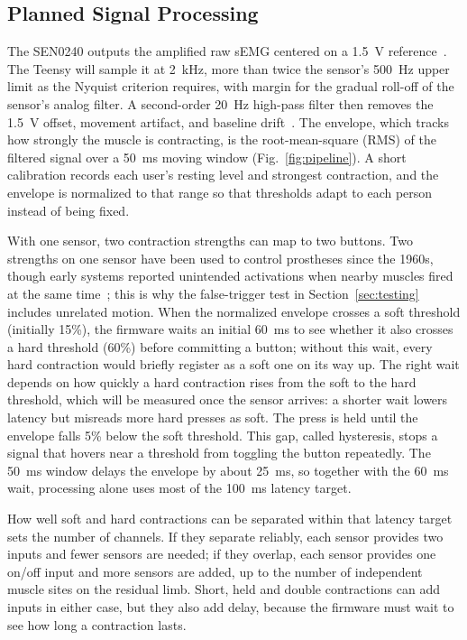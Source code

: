 \documentclass[conference]{IEEEtran}
\begin{document}
\subsection{Planned Signal Processing}
\label{sec:dsp}

The SEN0240 outputs the amplified raw sEMG centered on a 1.5~V reference~\cite{sen0240}. The Teensy will sample it at 2~kHz, more than twice the sensor's 500~Hz upper limit as the Nyquist criterion requires, with margin for the gradual roll-off of the sensor's analog filter. A second-order 20~Hz high-pass filter then removes the 1.5~V offset, movement artifact, and baseline drift~\cite{deluca}. The envelope, which tracks how strongly the muscle is contracting, is the root-mean-square (RMS) of the filtered signal over a 50~ms moving window (Fig.~\ref{fig:pipeline}). A short calibration records each user's resting level and strongest contraction, and the envelope is normalized to that range so that thresholds adapt to each person instead of being fixed.

With one sensor, two contraction strengths can map to two buttons. Two strengths on one sensor have been used to control prostheses since the 1960s, though early systems reported unintended activations when nearby muscles fired at the same time~\cite{dorcas}; this is why the false-trigger test in Section~\ref{sec:testing} includes unrelated motion. When the normalized envelope crosses a soft threshold (initially 15\%), the firmware waits an initial 60~ms to see whether it also crosses a hard threshold (60\%) before committing a button; without this wait, every hard contraction would briefly register as a soft one on its way up. The right wait depends on how quickly a hard contraction rises from the soft to the hard threshold, which will be measured once the sensor arrives: a shorter wait lowers latency but misreads more hard presses as soft. The press is held until the envelope falls 5\% below the soft threshold. This gap, called hysteresis, stops a signal that hovers near a threshold from toggling the button repeatedly. The 50~ms window delays the envelope by about 25~ms, so together with the 60~ms wait, processing alone uses most of the 100~ms latency target.

How well soft and hard contractions can be separated within that latency target sets the number of channels. If they separate reliably, each sensor provides two inputs and fewer sensors are needed; if they overlap, each sensor provides one on/off input and more sensors are added, up to the number of independent muscle sites on the residual limb. Short, held and double contractions can add inputs in either case, but they also add delay, because the firmware must wait to see how long a contraction lasts.
\end{document}
